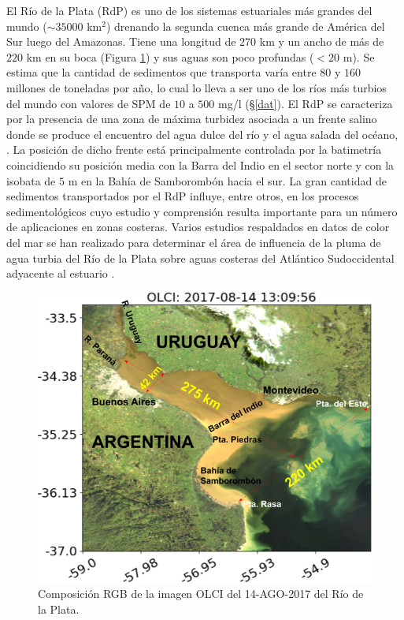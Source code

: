     El Río de la Plata (RdP) es uno de los sistemas estuariales más grandes del mundo ($\sim 35000$ km$^{2}$) drenando la segunda cuenca más grande de América del Sur luego del Amazonas. Tiene una longitud de $270$ km y un ancho de más de $220$ km en su boca (Figura \ref{int:rdp}) y sus aguas son poco profundas ($<20$ m). Se estima que la cantidad de sedimentos que transporta varía entre $80$ y $160$ millones de toneladas por año, lo cual lo lleva a ser uno de los ríos más turbios del mundo con valores de SPM de $10$ a $500$ mg/l (\S \ref{dat}). El RdP se caracteriza por la presencia de una zona de máxima turbidez asociada a un frente salino donde se produce el encuentro del agua dulce del río y el agua salada del océano, \cite{guerrero1997}\cite{mianzan2001}. La posición de dicho frente está principalmente controlada por la batimetría coincidiendo su posición media con la Barra del Indio en el sector norte y con la isobata de $5$ m en la Bahía de Samborombón hacia el sur. La gran cantidad de sedimentos transportados por el RdP influye, entre otros, en los procesos sedimentológicos cuyo estudio y comprensión resulta importante para un número de aplicaciones en zonas costeras. Varios estudios respaldados en datos de color del mar se han realizado para determinar el área de influencia de la pluma de agua turbia del Río de la Plata sobre aguas costeras del Atlántico Sudoccidental adyacente al estuario \cite{carvalho2014}\cite{garcia2008}\cite{piola2004}\cite{piola2008}.
    
    \begin{figure}
    \centering
    \includegraphics[width=\textwidth]{int/figures/rdp.png}
    \caption[Composición RGB del Río de la Plata.]{Composición RGB de la imagen OLCI del 14-AGO-2017 del Río de la Plata.}
    \label{int:rdp}
    \end{figure}

